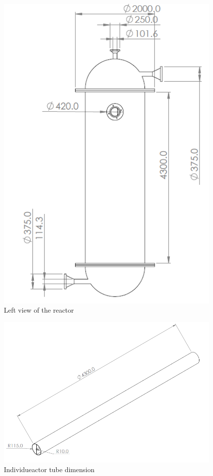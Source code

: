 \begin{figure}[h]
\begin{minipage}[t]{0.49\linewidth}
        \includegraphics[width=\linewidth]{chapters/2-reaction/figures/FYD reactor left view with calc.PNG}
        \caption{Left view of the reactor}
        \label{fig:reactorleft}
    \end{minipage}
\end{figure}

\begin{figure}
    \centering
    \includegraphics{chapters/2-reaction/figures/FYD solo tube with calc.PNG}
    \caption{Individueactor tube dimension}
    \label{fig:my_label}
\end{figure}